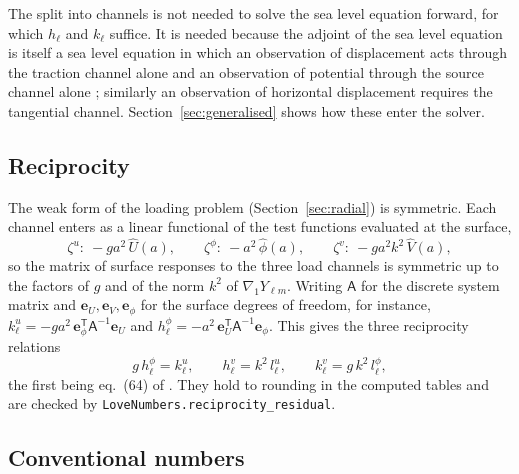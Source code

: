 \documentclass[11pt,a4paper]{article}
\newcommand{\gradone}{\nabla_{1}}
\newcommand{\Ylm}{Y_{\ell m}}
\newcommand{\code}[1]{\texttt{#1}}
\numberwithin{equation}{section}
\begin{document}
The split into channels is not needed to solve the sea level equation forward,
for which $h_{\ell}$ and $k_{\ell}$ suffice. It is needed because the adjoint
of the sea level equation is itself a sea level equation in which an
observation of displacement acts through the traction channel alone and an
observation of potential through the source channel alone
\citep{AlAttarEtAl2024}; similarly an observation of horizontal displacement
requires the tangential channel. Section~\ref{sec:generalised} shows how these
enter the solver.

\subsection{Reciprocity}

The weak form of the loading problem (Section~\ref{sec:radial}) is symmetric.
Each channel enters as a linear functional of the test functions evaluated at
the surface,
\begin{equation}
\zeta^{u}:\ -g a^{2}\,\hat U(a),\qquad
\zeta^{\phi}:\ -a^{2}\,\hat\phi(a),\qquad
\zeta^{v}:\ -g a^{2} k^{2}\,\hat V(a),
\label{eq:loadfunctionals}
\end{equation}
so the matrix of surface responses to the three load channels is symmetric up to
the factors of $g$ and of the norm $k^{2}$ of $\gradone\Ylm$. Writing $\mathsf{A}$
for the discrete system matrix and $\mathbf{e}_{U},\mathbf{e}_{V},\mathbf{e}_{\phi}$
for the surface degrees of freedom, for instance,
$k^{u}_{\ell} = -g a^{2}\,\mathbf{e}_{\phi}^{\mathsf T}\mathsf{A}^{-1}\mathbf{e}_{U}$
and $h^{\phi}_{\ell} = -a^{2}\,\mathbf{e}_{U}^{\mathsf T}\mathsf{A}^{-1}\mathbf{e}_{\phi}$.
This gives the three reciprocity relations
\begin{equation}
g\,h^{\phi}_{\ell} = k^{u}_{\ell},\qquad
h^{v}_{\ell} = k^{2}\,l^{u}_{\ell},\qquad
k^{v}_{\ell} = g\,k^{2}\,l^{\phi}_{\ell},
\label{eq:reciprocity}
\end{equation}
the first being eq.~(64) of \citet{AlAttarEtAl2024}. They hold to rounding in
the computed tables and are checked by \code{LoveNumbers.reciprocity\_residual}.

\subsection{Conventional numbers}
\end{document}
